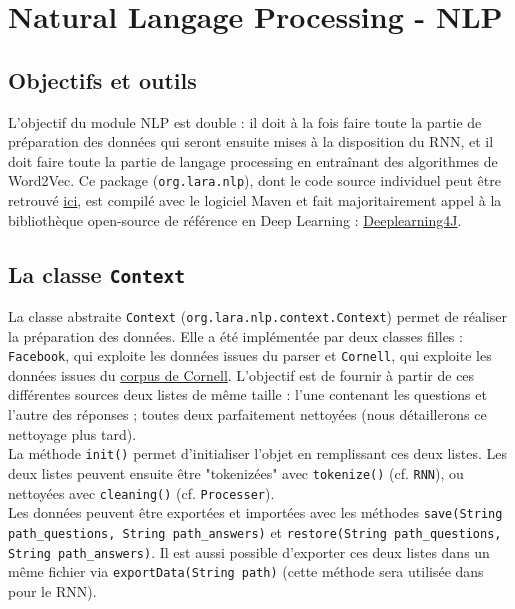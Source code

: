 \documentclass[10pt,a4paper]{article}
\newcommand\tab[1][0.5cm]{\hspace*{#1}}
\begin{document}
\section{Natural Langage Processing - NLP}
\subsection{Objectifs et outils}
L'objectif du module NLP est double : il doit à la fois faire toute la partie de préparation des données qui seront ensuite mises à la disposition du RNN, et il doit faire toute la partie de langage processing en entraînant des algorithmes de Word2Vec. Ce package (\texttt{org.lara.nlp}), dont le code source individuel peut être retrouvé \href{https://github.com/LaraProject/nlp}{ici}, est compilé avec le logiciel Maven et fait majoritairement appel à la bibliothèque open-source de référence en Deep Learning : \href{https://deeplearning4j.konduit.ai/}{Deeplearning4J}.

\subsection{La classe \texttt{Context}}
La classe abstraite \texttt{Context} (\texttt{org.lara.nlp.context.Context}) permet de réaliser la préparation des données. Elle a été implémentée par deux classes filles : \texttt{Facebook}, qui exploite les données issues du parser et \texttt{Cornell}, qui exploite les données issues du \href{https://www.cs.cornell.edu/~cristian/Cornell_Movie-Dialogs_Corpus.html}{corpus de Cornell}. L'objectif est de fournir à partir de ces différentes sources deux listes de même taille : l'une contenant les questions et l'autre des réponses ; toutes deux parfaitement nettoyées (nous détaillerons ce nettoyage plus tard). \\
\tab La méthode \texttt{init()} permet d'initialiser l'objet en remplissant ces deux listes. Les deux listes peuvent ensuite être "tokenizées" avec \texttt{tokenize()} (cf. \texttt{RNN}), ou nettoyées avec \texttt{cleaning()} (cf. \texttt{Processer}). \\
\tab Les données peuvent être exportées et importées avec les méthodes \texttt{save(String path\_questions, String path\_answers)} et \texttt{restore(String path\_questions, String path\_answers)}. Il est aussi possible d'exporter ces deux listes dans un même fichier via \texttt{exportData(String path)} (cette méthode sera utilisée dans pour le RNN).
\end{document}
